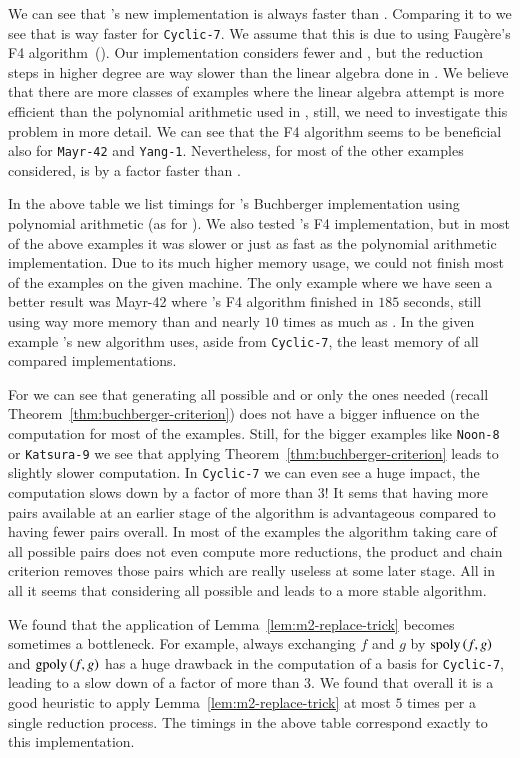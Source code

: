 We can see that \singular's new implementation is always faster than \macaulay.
Comparing it to \magma we see that \magma is way faster for \texttt{Cyclic-7}.
We assume that this is due to \magma using Faug\`ere's F4
algorithm~(\cite{fF41999}). Our implementation considers fewer \spts and \gpts, but
the reduction steps in higher degree are way slower than the linear algebra done
in \magma. We believe that there are more classes of examples where the linear
algebra attempt is more efficient than the polynomial arithmetic used in
\singular, still, we need to investigate this problem in more detail. We can see
that the F4 algorithm seems to be beneficial also for \texttt{Mayr-42} and \texttt{Yang-1}.
Nevertheless, for most of the other examples considered, \singular is by a
factor faster than \magma.

In the above table we list timings for \macaulay's Buchberger implementation
using polynomial arithmetic (as for \singular).
We also tested \macaulay's F4 implementation, but in most of the above examples
it was slower or just as fast as the polynomial arithmetic implementation. Due
to its much higher memory usage, we could not finish most of the examples on the
given machine. The only example where we have seen a better result was Mayr-42
where \macaulay's F4 algorithm finished in $185$ seconds, still using way more
memory than \magma and nearly $10$ times as much as \singular. In the given
example \singular's new algorithm uses, aside from \texttt{Cyclic-7}, the least memory
of all compared implementations.

For \singular we can see that generating all possible \spts and \gpts or only
the ones needed (recall Theorem~\ref{thm:buchberger-criterion}) does not have a
bigger influence on the computation for most of the examples.
Still, for the bigger examples like \texttt{Noon-8} or \texttt{Katsura-9} we see that applying
Theorem~\ref{thm:buchberger-criterion} leads to slightly slower computation. In
\texttt{Cyclic-7} we can even see a huge impact, the computation slows down by a factor
of more than $3$! It sems that having more pairs available at an earlier stage
of the algorithm is advantageous compared to having fewer pairs overall. In most
of the examples the algorithm taking care of all possible pairs does not even
compute more reductions, the product and chain criterion removes those
pairs which are really useless at some later stage. All in all it seems that
considering all possible \spts and \gpts leads to a more stable algorithm.

We found that the application of Lemma~\ref{lem:m2-replace-trick} becomes
sometimes a bottleneck. For example, always exchanging $f$ and $g$ by $\mathrm{spoly}\left({f},{g}\right)$ and $\mathrm{gpoly}\left({f},{g}\right)$ has a huge drawback in the computation of a basis for
\texttt{Cyclic-7}, leading to a slow down of a factor of more than $3$. We found
that overall it is a good heuristic to apply Lemma~\ref{lem:m2-replace-trick} at
most $5$ times per a single reduction process. The \singular timings in the
above table correspond exactly to this implementation.
